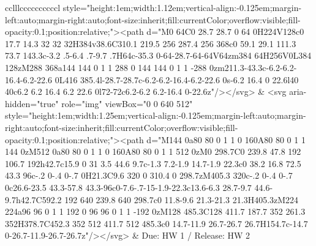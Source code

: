 \documentclass[
]{article}
\begin{document}
\begin{figure*}
\begin{longtable*}{cclllccccccccccl}
style="height:1em;width:1.12em;vertical-align:-0.125em;margin-left:auto;margin-right:auto;font-size:inherit;fill:currentColor;overflow:visible;fill-opacity:0.1;position:relative;"><path d="M0 64C0 28.7 28.7 0 64 0H224V128c0 17.7 14.3 32 32 32H384v38.6C310.1 219.5 256 287.4 256 368c0 59.1 29.1 111.3 73.7 143.3c-3.2 .5-6.4 .7-9.7 .7H64c-35.3 0-64-28.7-64-64V64zm384 64H256V0L384 128zM288 368a144 144 0 1 1 288 0 144 144 0 1 1 -288 0zm211.3-43.3c-6.2-6.2-16.4-6.2-22.6 0L416 385.4l-28.7-28.7c-6.2-6.2-16.4-6.2-22.6 0s-6.2 16.4 0 22.6l40 40c6.2 6.2 16.4 6.2 22.6 0l72-72c6.2-6.2 6.2-16.4 0-22.6z"/></svg> & <svg aria-hidden="true" role="img" viewBox="0 0 640 512" style="height:1em;width:1.25em;vertical-align:-0.125em;margin-left:auto;margin-right:auto;font-size:inherit;fill:currentColor;overflow:visible;fill-opacity:0.1;position:relative;"><path d="M144 0a80 80 0 1 1 0 160A80 80 0 1 1 144 0zM512 0a80 80 0 1 1 0 160A80 80 0 1 1 512 0zM0 298.7C0 239.8 47.8 192 106.7 192h42.7c15.9 0 31 3.5 44.6 9.7c-1.3 7.2-1.9 14.7-1.9 22.3c0 38.2 16.8 72.5 43.3 96c-.2 0-.4 0-.7 0H21.3C9.6 320 0 310.4 0 298.7zM405.3 320c-.2 0-.4 0-.7 0c26.6-23.5 43.3-57.8 43.3-96c0-7.6-.7-15-1.9-22.3c13.6-6.3 28.7-9.7 44.6-9.7h42.7C592.2 192 640 239.8 640 298.7c0 11.8-9.6 21.3-21.3 21.3H405.3zM224 224a96 96 0 1 1 192 0 96 96 0 1 1 -192 0zM128 485.3C128 411.7 187.7 352 261.3 352H378.7C452.3 352 512 411.7 512 485.3c0 14.7-11.9 26.7-26.7 26.7H154.7c-14.7 0-26.7-11.9-26.7-26.7z"/></svg> & Due: HW 1 / Release: HW 2 \\ 

\end{longtable*}
\end{figure*}
\end{document}
